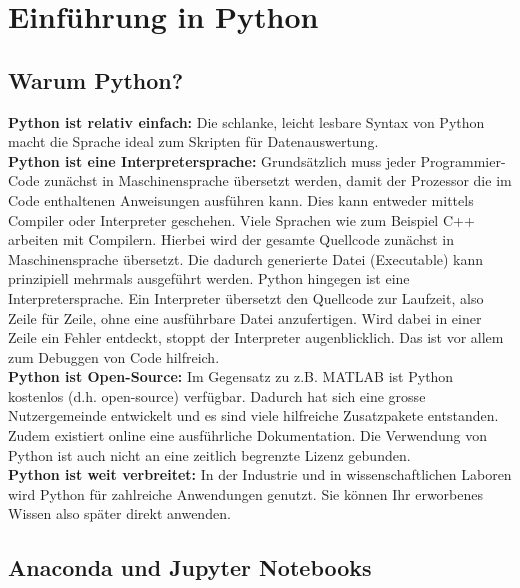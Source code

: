 \chapter{Einführung in Python}
\label{chap:py}

\section{Warum Python?}
\label{chap:py:sec:warumpython}

\textbf{Python ist relativ einfach:} Die schlanke, leicht lesbare Syntax von Python macht die Sprache ideal zum Skripten für Datenauswertung.   \\

\textbf{Python ist eine Interpretersprache:}
Grundsätzlich muss jeder Programmier-Code zunächst in Maschinensprache übersetzt werden, damit der Prozessor die im Code enthaltenen Anweisungen ausführen kann. Dies kann entweder mittels Compiler oder Interpreter geschehen. Viele Sprachen wie zum Beispiel C++ arbeiten mit Compilern. Hierbei wird der gesamte Quellcode zunächst in Maschinensprache übersetzt.  Die dadurch generierte Datei (Executable) kann prinzipiell mehrmals ausgeführt werden.  Python hingegen ist eine Interpretersprache.  Ein Interpreter übersetzt den Quellcode zur Laufzeit, also Zeile für Zeile, ohne eine ausführbare Datei anzufertigen. Wird dabei in einer Zeile ein Fehler entdeckt, stoppt der Interpreter augenblicklich.  Das ist vor allem zum Debuggen von Code hilfreich.  \\

\textbf{Python ist Open-Source:} Im Gegensatz zu z.B. MATLAB ist Python kostenlos (d.h. open-source) verfügbar. Dadurch hat sich eine grosse Nutzergemeinde entwickelt und es sind viele hilfreiche Zusatzpakete entstanden.  Zudem existiert online eine  ausführliche Dokumentation. Die Verwendung von Python ist auch nicht an eine zeitlich begrenzte Lizenz gebunden. \\

\textbf{Python ist weit verbreitet:} In der Industrie und in wissenschaftlichen Laboren wird Python für zahlreiche Anwendungen genutzt. Sie können Ihr erworbenes Wissen also später direkt anwenden. \\


\section{Anaconda und Jupyter Notebooks}
\label{chap:py:sec:anaconda}

